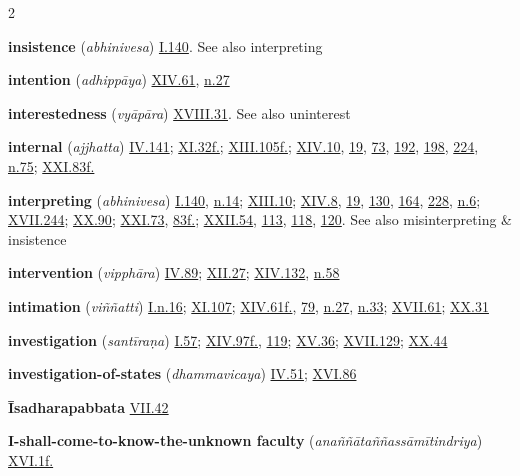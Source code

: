 \begin{multicols}{2}
\begin{vismHanging}
\par\textbf{insistence} (\emph{abhinivesa}) \hyperlink{I.140}{I.140}{}. See also interpreting 
\par\textbf{intention} (\emph{adhippāya}) \hyperlink{XIV.61}{XIV.61}{}, \hyperlink{XIV.n27}{n.27}{}
\par\textbf{interestedness} (\emph{vyāpāra}) \hyperlink{XVIII.31}{XVIII.31}{}. See also uninterest 
\par\textbf{internal} (\emph{ajjhatta}) \hyperlink{IV.141}{IV.141}{}; \hyperlink{XI.32}{XI.32f.}{}; \hyperlink{XIII.105}{XIII.105f.}{}; \hyperlink{XIV.10}{XIV.10}{}, \hyperlink{XIV.19}{19}{}, \hyperlink{XIV.73}{73}{}, \hyperlink{XIV.192}{192}{}, \hyperlink{XIV.198}{198}{}, \hyperlink{XIV.224}{224}{}, \hyperlink{XIV.n75}{n.75}{}; \hyperlink{XXI.83}{XXI.83f.}{}
\par\textbf{interpreting} (\emph{abhinivesa}) \hyperlink{I.140}{I.140}{}, \hyperlink{I.n14}{n.14}{}; \hyperlink{XIII.10}{XIII.10}{}; \hyperlink{XIV.8}{XIV.8}{}, \hyperlink{XIV.19}{19}{}, \hyperlink{XIV.130}{130}{}, \hyperlink{XIV.164}{164}{}, \hyperlink{XIV.228}{228}{}, \hyperlink{XIV.n6}{n.6}{}; \hyperlink{XVII.244}{XVII.244}{}; \hyperlink{XX.90}{XX.90}{}; \hyperlink{XXI.73}{XXI.73}{}, \hyperlink{XXI.83}{83f.}{}; \hyperlink{XXII.54}{XXII.54}{}, \hyperlink{XXII.113}{113}{}, \hyperlink{XXII.118}{118}{}, \hyperlink{XXII.120}{120}{}. See also misinterpreting \& insistence 
\par\textbf{intervention} (\emph{vipphāra}) \hyperlink{IV.89}{IV.89}{}; \hyperlink{XII.27}{XII.27}{}; \hyperlink{XIV.132}{XIV.132}{}, \hyperlink{XIV.n58}{n.58}{}
\par\textbf{intimation} (\emph{viññatti}) \hyperlink{I.n16}{I.n.16}{}; \hyperlink{XI.107}{XI.107}{}; \hyperlink{XIV.61}{XIV.61f.}{}, \hyperlink{XIV.79}{79}{}, \hyperlink{XIV.n27}{n.27}{}, \hyperlink{XIV.n33}{n.33}{}; \hyperlink{XVII.61}{XVII.61}{}; \hyperlink{XX.31}{XX.31}{}
\par\textbf{investigation} (\emph{santīraṇa}) \hyperlink{I.57}{I.57}{}; \hyperlink{XIV.97}{XIV.97f.}{}, \hyperlink{XIV.119}{119}{}; \hyperlink{XV.36}{XV.36}{}; \hyperlink{XVII.129}{XVII.129}{}; \hyperlink{XX.44}{XX.44}{}
\par\textbf{investigation-of-states} (\emph{dhammavicaya}) \hyperlink{IV.51}{IV.51}{}; \hyperlink{XVI.86}{XVI.86}{}
\par\textbf{Īsadharapabbata} \hyperlink{VII.42}{VII.42}{}
\par\textbf{I-shall-come-to-know-the-unknown faculty} (\emph{anaññātaññassāmītindriya}) \hyperlink{XVI.1}{XVI.1f.}{}

\end{vismHanging}
\end{multicols}
